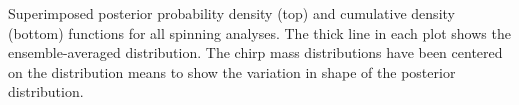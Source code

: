 Superimposed posterior probability density (top) and cumulative density (bottom) functions for all spinning analyses.  The thick line in each plot shows the ensemble-averaged distribution.  The chirp mass distributions have been centered on the distribution means to show the variation in shape of the posterior distribution.